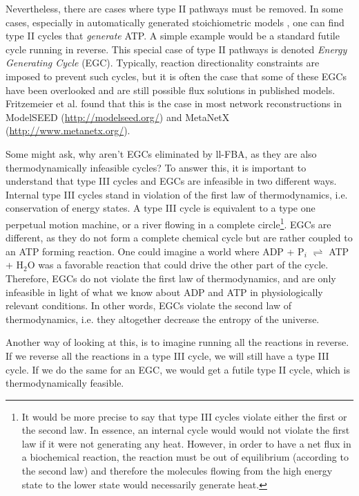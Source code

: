 \documentclass[twocolumn]{bmcart}%
\begin{document}
Nevertheless, there are cases where type II pathways must be removed. In some cases, especially in automatically generated stoichiometric models \cite{Fritzemeier2017-ba}, one can find type II cycles that \textit{generate} ATP. A simple example would be a standard futile cycle running in reverse. This special case of type II pathways is denoted \textit{Energy Generating Cycle} (EGC). Typically, reaction directionality constraints are imposed to prevent such cycles, but it is often the case that some of these EGCs have been overlooked and are still possible flux solutions in published models. Fritzemeier et al. \cite{Fritzemeier2017-ba} found that this is the case in most network reconstructions in ModelSEED (\url{http://modelseed.org/}) and MetaNetX (\url{http://www.metanetx.org/}). 

Some might ask, why aren't EGCs eliminated by ll-FBA, as they are also thermodynamically infeasible cycles? To answer this, it is important to understand that type III cycles and EGCs are infeasible in two different ways. Internal type III cycles stand in violation of the first law of thermodynamics, i.e. conservation of energy states. A type III cycle is equivalent to a type one perpetual motion machine, or a river flowing in a complete circle\footnote{It would be more precise to say that type III cycles violate either the first or the second law. In essence, an internal cycle would would not violate the first law if it were not generating any heat. However, in order to have a net flux in a biochemical reaction, the reaction must be out of equilibrium (according to the second law) and therefore the molecules flowing from the high energy state to the lower state would necessarily generate heat.}. EGCs are different, as they do not form a complete chemical cycle but are rather coupled to an ATP forming reaction. One could imagine a world where ADP + P$_i$ $\rightleftharpoons$ ATP + H$_2$O was a favorable reaction that could drive the other part of the cycle. Therefore, EGCs do not violate the first law of thermodynamics, and are only infeasible in light of what we know about ADP and ATP in physiologically relevant conditions. In other words, EGCs violate the second law of thermodynamics, i.e. they altogether decrease the entropy of the universe.

Another way of looking at this, is to imagine running all the reactions in reverse. If we reverse all the reactions in a type III cycle, we will still have a type III cycle. If we do the same for an EGC, we would get a futile type II cycle, which is thermodynamically feasible.
\end{document}
